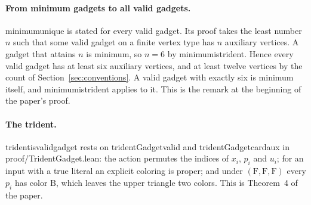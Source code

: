 \documentclass[11pt,a4paper]{article}
\newcommand{\leanus}{\textunderscore\allowbreak}
\newcommand{\lean}[1]{{\ttfamily\let\_\leanus #1}}
\newcommand{\F}{\mathrm{F}}
\newcommand{\B}{\mathrm{B}}
\begin{document}
\paragraph{From minimum gadgets to all valid gadgets.}
\lean{minimum\_unique} is stated for every valid gadget. Its proof takes the
least number $n$ such that some valid gadget on a finite vertex type has $n$
auxiliary vertices. A gadget that attains $n$ is minimum, so $n=6$ by
\lean{minimum\_is\_trident}. Hence every valid gadget has at least six
auxiliary vertices, and at least twelve vertices by the count of
Section~\ref{sec:conventions}. A valid gadget with exactly six is minimum
itself, and \lean{minimum\_is\_trident} applies to it. This is the remark at
the beginning of the paper's proof.

\paragraph{The trident.} \lean{trident\_is\_valid\_gadget} rests on
\lean{tridentGadget\_valid} and \lean{tridentGadget\_card\_aux} in
\lean{proof/TridentGadget.lean}: the action permutes the indices of $x_i$,
$p_i$ and $u_i$; for an input with a true literal an explicit coloring is
proper; and under $(\F,\F,\F)$ every $p_i$ has color $\B$, which leaves the
upper triangle two colors. This is Theorem~4 of the paper.
\end{document}
